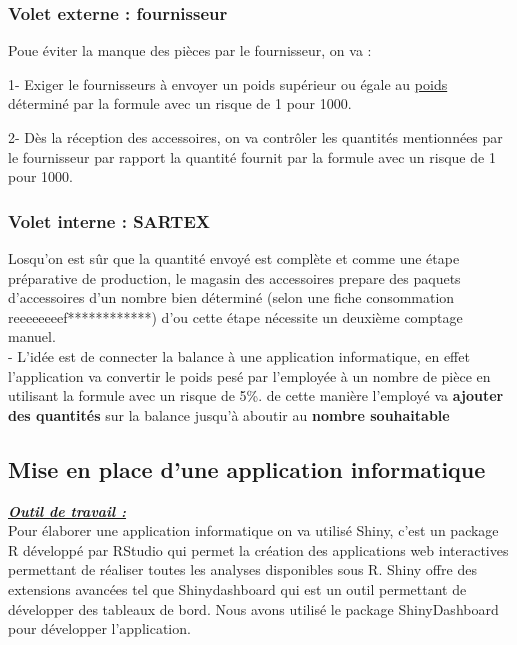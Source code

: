 \documentclass[12pt, a4paper]{thesis}
\begin{document}
\subsubsection{Volet externe :  fournisseur}
Poue éviter la manque des pièces par le fournisseur, on va : 
\item 1- Exiger le fournisseurs à envoyer un poids supérieur ou égale au \underline{poids} déterminé par la formule avec un risque de 1 pour 1000.
\item 2- Dès la réception des accessoires, on va contrôler les quantités mentionnées par le fournisseur par rapport la quantité fournit par la formule avec un risque de 1 pour 1000.
\subsubsection{Volet interne : SARTEX}
Losqu'on est sûr que la quantité envoyé est complète et comme une étape préparative de production, le magasin des accessoires prepare des paquets d'accessoires d'un nombre bien déterminé (selon une fiche consommation reeeeeeeef************) d'ou cette étape nécessite un deuxième comptage manuel.\\


- L'idée est de connecter la balance à une application informatique, en effet l'application va convertir le poids pesé par l'employée à un nombre de pièce en utilisant la formule avec un risque de 5\%.
de cette manière l'employé va \textbf{ajouter des quantités} sur la balance jusqu'à aboutir au \textbf{nombre souhaitable}
\subsection{Mise en place d'une application informatique}

\underline{\textit{\textbf{Outil de travail :}}}\\
Pour élaborer une application informatique on va utilisé Shiny, c'est un package R développé par RStudio qui permet la création des
applications web interactives permettant de réaliser toutes les analyses disponibles
sous R. Shiny offre des extensions avancées tel que Shinydashboard
qui est un outil permettant de développer des tableaux de bord.
Nous avons utilisé le package ShinyDashboard pour développer l'application.\\
\end{document}

